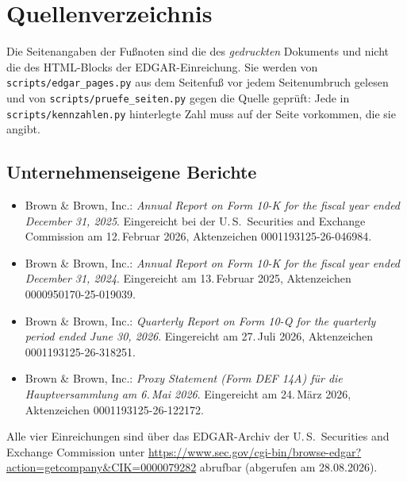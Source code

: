 \section*{Quellenverzeichnis}

Die Seitenangaben der Fu{\ss}noten sind die des \emph{gedruckten}
Dokuments und nicht die des HTML-Blocks der EDGAR-Einreichung. Sie werden
von \texttt{scripts/edgar\_pages.py} aus dem Seitenfu{\ss} vor jedem
Seitenumbruch gelesen und von \texttt{scripts/pruefe\_seiten.py} gegen die
Quelle gepr\"uft: Jede in \texttt{scripts/kennzahlen.py} hinterlegte Zahl
muss auf der Seite vorkommen, die sie angibt.

\subsection*{Unternehmenseigene Berichte}

\begin{itemize}
\item \label{quelle:gb2025} Brown \& Brown, Inc.: \emph{Annual Report on
Form 10-K for the fiscal year ended December 31, 2025}. Eingereicht bei der
U.\,S.\ Securities and Exchange Commission am 12.\,Februar 2026,
Aktenzeichen 0001193125-26-046984.
\item \label{quelle:gb2024} Brown \& Brown, Inc.: \emph{Annual Report on
Form 10-K for the fiscal year ended December 31, 2024}. Eingereicht am
13.\,Februar 2025, Aktenzeichen 0000950170-25-019039.
\item \label{quelle:Form 10-Q Q2 2026} Brown \& Brown, Inc.:
\emph{Quarterly Report on Form 10-Q for the quarterly period ended June 30,
2026}. Eingereicht am 27.\,Juli 2026, Aktenzeichen 0001193125-26-318251.
\item \label{quelle:Proxy Statement 2026} Brown \& Brown, Inc.:
\emph{Proxy Statement (Form DEF 14A) f\"ur die Hauptversammlung am
6.\,Mai 2026}. Eingereicht am 24.\,M\"arz 2026, Aktenzeichen
0001193125-26-122172.
\end{itemize}

Alle vier Einreichungen sind \"uber das EDGAR-Archiv der U.\,S.\ Securities
and Exchange Commission unter
\url{https://www.sec.gov/cgi-bin/browse-edgar?action=getcompany&CIK=0000079282}
abrufbar (abgerufen am 28.08.2026).

